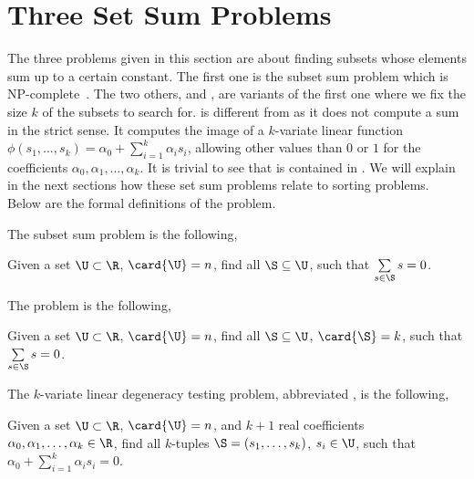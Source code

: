 
\section{Three Set Sum Problems}

The three problems given in this section are about finding subsets whose
elements sum up to a certain constant. The first one is the subset sum problem
which is NP-complete~\cite{karp:1972}. The two others, \kSUM and \kLDT, are
variants of the first one where we fix the size $k$ of the subsets to search
for. \kLDT is different from \kSUM as it does not compute a sum in the
strict sense.  It computes the image of a $k$-variate linear function
$\phi(s_1, \ldots, s_k) = \alpha_0 + \sum_{i=1}^{k} \alpha_i s_i$, allowing
other values than $0$ or $1$ for the coefficients $\alpha_0, \alpha_1, \ldots,
\alpha_k$. It is trivial to see that \kSUM is contained in \kLDT. We will
explain in the next sections how these set sum problems relate to sorting
problems. Below are the formal definitions of the problem.

The subset sum problem is the following,

\begin{problem}
Given a set $\U \subset \R$, $\card{\U} = n$, find all
$\S \subseteq \U$, such that $\sum\limits_{s \in \S} s = 0$.
\end{problem}


The \kSUM problem is the following,

\begin{problem}
Given a set $\U \subset \R$, $\card{\U} = n$, find all
$\S \subseteq \U$, $\card{\S} = k$, such that $\sum\limits_{s
\in \S} s = 0$.
\end{problem}


The $k$-variate linear degeneracy testing problem, abbreviated \kLDT, is the
following,

\begin{problem}
Given a set $\U \subset \R$, $\card{\U} = n$, and $k+1$ real
coefficients $\alpha_0, \alpha_1, \ldots, \alpha_k \in \R$, find all $k$-tuples
$\S = (s_1, \ldots, s_k)$, $s_i \in \U$, such that
$\alpha_0 + \sum_{i=1}^{k} \alpha_i s_i = 0$.
\end{problem}
